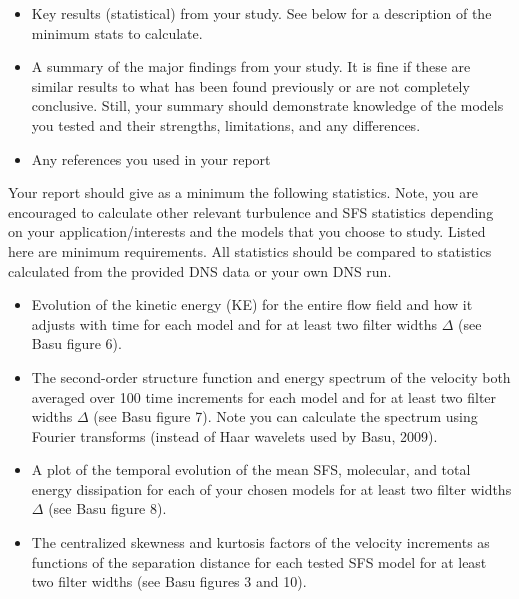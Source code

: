 \documentclass[11pt]{article}
\begin{document}
\begin{itemize}
\item Key results (statistical) from your study.  See below for a description of the minimum stats to
calculate.

\item A summary of the major findings from your study.  It is fine if these are similar results to what
has been found previously or are not completely conclusive.  Still, your summary should demonstrate 
knowledge of the models you tested and their strengths, limitations, and any differences.

\item Any references you used in your report

\end{itemize}

\noindent Your report should give as a minimum the following statistics.  Note, you are encouraged to calculate other relevant turbulence and SFS statistics depending on your application/interests and the models that you choose to study. Listed here are minimum requirements.  All statistics should be compared to statistics calculated from the provided DNS data or your own DNS run.

\begin{itemize}

\item Evolution of the kinetic energy (KE) for the entire flow field and how it adjusts with time for each model and for at least two filter widths $\Delta$ (see Basu figure 6).    
  
\item The second-order structure function and energy spectrum of the velocity both averaged over 100 time increments for each model and for at least two filter widths $\Delta$ (see Basu figure 7).  Note you can calculate the spectrum using Fourier transforms (instead of Haar wavelets used by Basu, 2009).

\item A plot of the temporal evolution of the mean SFS, molecular, and total energy dissipation for each of your chosen models for at least two filter widths $\Delta$ (see Basu figure 8).

\item The centralized skewness and kurtosis factors of the velocity increments as functions of the separation distance for each tested SFS model for at least two filter widths (see Basu figures 3 and 10).   

\end{itemize}
\end{document}
